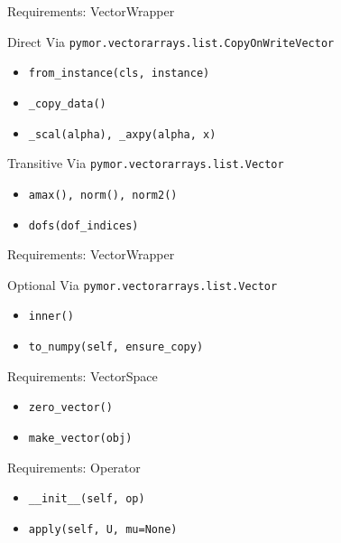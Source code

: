 \documentclass[%
  10pt,
  compress,
  table,
]{beamer}
\begin{document}
\begin{frame}[fragile]{Requirements: VectorWrapper} 
\begin{block}{Direct}
  Via \texttt{pymor.vectorarrays.list.CopyOnWriteVector}
  \begin{itemize}
    \item  \texttt{from_instance(cls, instance)}
    \item \texttt{_copy_data()}
    \item \texttt{_scal(alpha), _axpy(alpha, x)}
  \end{itemize}
\end{block}
\begin{block}{Transitive}
  Via \texttt{pymor.vectorarrays.list.Vector}
  \begin{itemize}
    \item \texttt{amax(), norm(), norm2()}
    \item \texttt{dofs(dof_indices)}
  \end{itemize}
\end{block}

\end{frame}

\begin{frame}[fragile]{Requirements: VectorWrapper} 
 
  \begin{block}{Optional}
    Via \texttt{pymor.vectorarrays.list.Vector}
    \begin{itemize}
      \item \texttt{inner()}
      \item \texttt{to_numpy(self, ensure_copy)}
    \end{itemize}
  \end{block}
\end{frame}

\begin{frame}[fragile]{Requirements: VectorSpace}
  \begin{itemize}
    \item \texttt{zero_vector()}
    \item \texttt{make_vector(obj)}
  \end{itemize}
\end{frame}

\begin{frame}[fragile]{Requirements: Operator}
  \begin{itemize}
    \item \texttt{__init__(self, op)}
    \item \texttt{apply(self, U, mu=None)}
  \end{itemize}
\end{frame}
\end{document}
